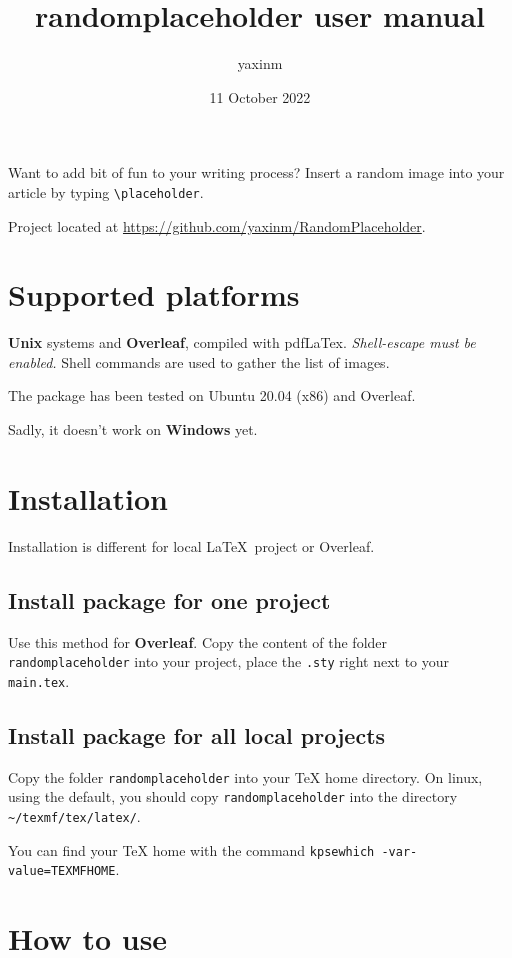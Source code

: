 \documentclass[12pt]{article}
\title{randomplaceholder user manual}
\author{yaxinm}
\date{11 October 2022}
\begin{document}
    \maketitle
    Want to add bit of fun to your writing process?
    Insert a random image into your article by typing \lstinline{\placeholder}. 
    
    Project located at \url{https://github.com/yaxinm/RandomPlaceholder}.
    
    \section{Supported platforms}
    \textbf{Unix} systems and \textbf{Overleaf}, compiled with pdfLaTex.
    \textit{Shell-escape must be enabled.} Shell commands are used to gather the list of images.

    The package has been tested on Ubuntu 20.04 (x86) and Overleaf.
    
    Sadly, it doesn't work on \textbf{Windows} yet.


    \section{Installation}
    Installation is different for local \LaTeX~project or Overleaf.

    \subsection{Install package for one project}
    Use this method for \textbf{Overleaf}.
    Copy the content of the folder \lstinline{randomplaceholder} into your project, place the \lstinline{.sty} right next to your \lstinline{main.tex}. 
    
    \subsection{Install package for all local projects}
    Copy the folder \lstinline{randomplaceholder} into your TeX home directory. On linux, using the default, you should copy \lstinline{randomplaceholder} into the directory \lstinline{~/texmf/tex/latex/}.

    You can find your TeX home with the command \lstinline{kpsewhich -var-value=TEXMFHOME}.


    \section{How to use}
\end{document}
